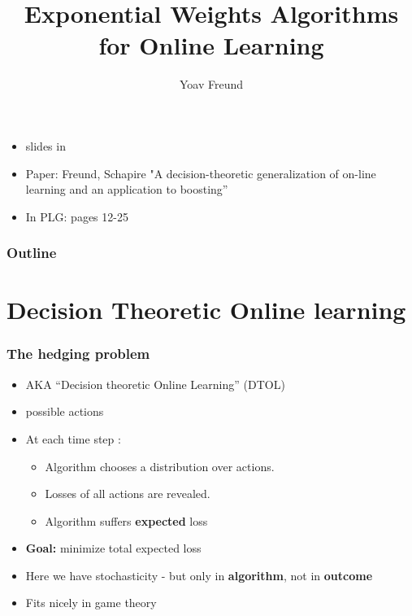 \documentclass{beamer}
\title[\ouralg] %
{Exponential Weights Algorithms for Online Learning}
\author[Freund] %
{Yoav Freund}
\date{}
\institute[Universities of Somewhere and Elsewhere] %
\begin{document}

\begin{frame}
  \titlepage
  \begin{small}
    \begin{itemize}
    \item slides in \\
    \item Paper: Freund, Schapire "A decision-theoretic generalization of on-line learning and an application to boosting''
    \item In PLG: pages 12-25
    \end{itemize}
  \end{small}
\end{frame}

\begin{frame}
  \frametitle{Outline}
  \tableofcontents[pausesections]
\end{frame}


\section{Decision Theoretic Online learning}
\begin{frame}
\frametitle{The hedging problem}

\begin{itemize}
\item AKA ``Decision theoretic Online Learning'' (DTOL)
\item {} possible actions 

\item At each time step :
\begin{itemize}
\item Algorithm chooses a distribution  over actions.
\item Losses  of all actions  are revealed.
\item Algorithm suffers {\bf expected} loss 
\end{itemize}
\item {{\bf Goal:} minimize total expected loss}
\item {Here we have stochasticity - but only in {\bf algorithm}, not in {\bf outcome}}
\item {Fits nicely in game theory}
\end{itemize}
\end{frame}
\end{document}
